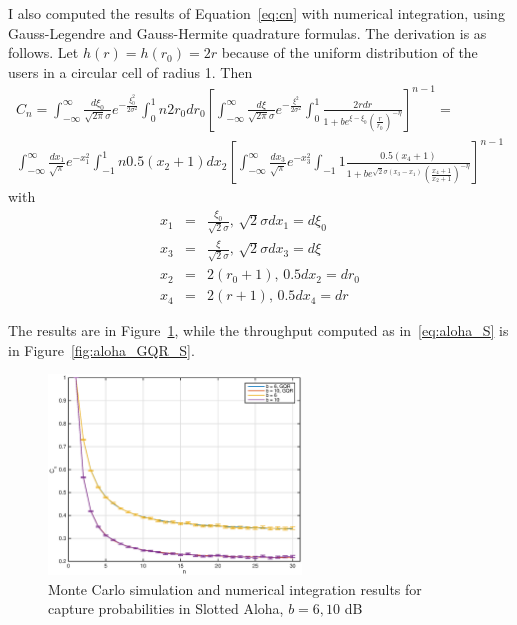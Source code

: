 \documentclass[10pt]{article}
\begin{document}
I also computed the results of Equation~\eqref{eq:cn} with numerical integration, using Gauss-Legendre and Gauss-Hermite quadrature formulas. The derivation is as follows. Let $h(r) = h(r_0) = 2r$ because of the uniform distribution of the users in a circular cell of radius 1. Then
\begin{eqnarray}
  C_n = \int_{-\infty}^{\infty} \frac{d\xi_0}{\sqrt{2\pi}\sigma} e^{-\frac{\xi_0^2}{2\sigma^2}} \int_0^1 n 2 r_0 dr_0 \left[
  \int_{-\infty}^{\infty} 
  \frac{d\xi}{\sqrt{2\pi}\sigma} 
  e^{-\frac{\xi^2}{2\sigma^2}} 
  \int_{0}^{1} 
  \frac{2r dr}{1 + b e^{\xi - \xi_0} \left( \frac{r}{r_0} \right)^{-\eta}}
  \right]^{n-1}
  = \\
  \int_{-\infty}^{\infty} \frac{dx_1}{\sqrt{\pi}}e^{-x_1^2}
  \int_{-1}^{1} n 0.5 (x_2 + 1) dx_2
  \left[
  \int_{-\infty}^{\infty} \frac{dx_3}{\sqrt{\pi}}e^{-x_3^2}
  \int_{-1}{1} \frac{0.5(x_4+1)}{1 + b e^{\sqrt{2}\sigma(x_3 - x_1)}\left( \frac{x_4+1}{x_2+1} \right)^{-\eta}}
  \right]^{n-1}
\end{eqnarray}
with 
\begin{eqnarray*}
x_1 &=& \frac{\xi_0}{\sqrt{2}\sigma}, \, \sqrt{2}\sigma dx_1 =  d\xi_0 \\
x_3 &=& \frac{\xi}{\sqrt{2}\sigma}, \, \sqrt{2}\sigma dx_3 = d\xi \\
x_2 &=& 2(r_0 + 1), \, 0.5 dx_2 = dr_0 \\
x_4 &=& 2(r + 1), \, 0.5 dx_4 = dr
\end{eqnarray*}

The results are in Figure~\ref{fig:aloha_GQR}, while the throughput computed as in~\eqref{eq:aloha_S} is in Figure~\ref{fig:aloha_GQR_S}.

\begin{figure}[h!]
  \centering
  \includegraphics[width = 0.6\textwidth]{aloha_GQR}
  \caption{Monte Carlo simulation and numerical integration results for capture probabilities in Slotted Aloha, $b = 6, 10$ dB}
  \label{fig:aloha_GQR}
\end{figure}
\end{document}
